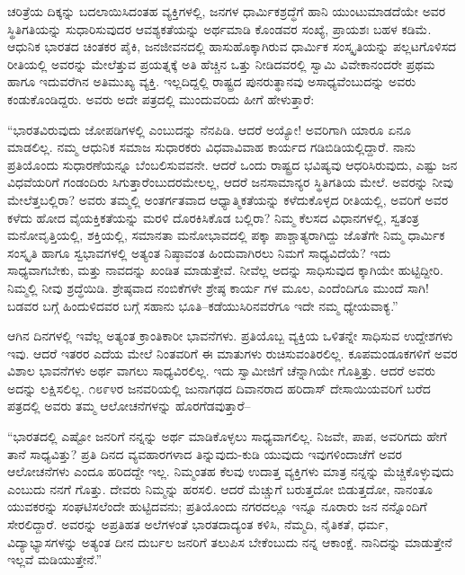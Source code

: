 ಚರಿತ್ರೆಯ ದಿಕ್ಕನ್ನು ಬದಲಾಯಿಸಿದಂತಹ ವ್ಯಕ್ತಿಗಳಲ್ಲಿ, ಜನಗಳ ಧಾರ್ಮಿಕಶ್ರದ್ಧೆಗೆ ಹಾನಿ ಯುಂಟುಮಾಡದೆಯೇ ಅವರ ಸ್ಥಿತಿಗತಿಯನ್ನು ಸುಧಾರಿಸುವುದರ ಆವಶ್ಯಕತೆಯನ್ನು ಅರ್ಥಮಾಡಿ ಕೊಂಡವರ ಸಂಖ್ಯೆ, ಪ್ರಾಯಶಃ ಬಹಳ ಕಡಿಮೆ. ಆಧುನಿಕ ಭಾರತದ ಚಿಂತಕರ ಪೈಕಿ, ಜನಜೀವನದಲ್ಲಿ ಹಾಸುಹೊಕ್ಕಾಗಿರುವ ಧಾರ್ಮಿಕ ಸಂಸ್ಕೃತಿಯನ್ನು ಪಲ್ಲಟಗೊಳಿಸದ ರೀತಿಯಲ್ಲಿ ಅವರನ್ನು ಮೇಲೆತ್ತುವ ಪ್ರಯತ್ನಕ್ಕೆ ಅತಿ ಹೆಚ್ಚಿನ ಒತ್ತು ನೀಡಿದವರಲ್ಲಿ ಸ್ವಾಮಿ ವಿವೇಕಾನಂದರೇ ಪ್ರಥಮ ಹಾಗೂ ಇದುವರೆಗಿನ ಅತಿಮುಖ್ಯ ವ್ಯಕ್ತಿ. ಇಲ್ಲದಿದ್ದಲ್ಲಿ ರಾಷ್ಟ್ರದ ಪುನರುತ್ಥಾನವು ಅಸಾಧ್ಯವೆಂಬುದನ್ನು ಅವರು ಕಂಡುಕೊಂಡಿದ್ದರು. ಅವರು ಅದೇ ಪತ್ರದಲ್ಲಿ ಮುಂದುವರಿದು ಹೀಗೆ ಹೇಳುತ್ತಾರೆ:

“ಭಾರತವಿರುವುದು ಜೋಪಡಿಗಳಲ್ಲಿ ಎಂಬುದನ್ನು ನೆನಪಿಡಿ. ಆದರೆ ಅಯ್ಯೋ! ಅವರಿಗಾಗಿ ಯಾರೂ ಏನೂ ಮಾಡಲಿಲ್ಲ. ನಮ್ಮ ಆಧುನಿಕ ಸಮಾಜ ಸುಧಾರಕರು ವಿಧವಾವಿವಾಹ ಕಾರ್ಯದ ಗಡಿಬಿಡಿಯಲ್ಲಿದ್ದಾರೆ. ನಾನು ಪ್ರತಿಯೊಂದು ಸುಧಾರಣೆಯನ್ನೂ ಬೆಂಬಲಿಸುವವನೇ. ಆದರೆ ಒಂದು ರಾಷ್ಟ್ರದ ಭವಿಷ್ಯವು ಆಧರಿಸಿರುವುದು, ಎಷ್ಟು ಜನ ವಿಧವೆಯರಿಗೆ ಗಂಡಂದಿರು ಸಿಗುತ್ತಾರೆಂಬುದರಮೇಲಲ್ಲ, ಆದರೆ ಜನಸಾಮಾನ್ಯರ ಸ್ಥಿತಿಗತಿಯ ಮೇಲೆ. ಅವರನ್ನು ನೀವು ಮೇಲೆತ್ತಬಲ್ಲಿರಾ? ಅವರು ತಮ್ಮಲ್ಲಿ ಅಂತರ್ಗತವಾದ ಆಧ್ಯಾತ್ಮಿಕತೆಯನ್ನು ಕಳೆದುಕೊಳ್ಳದ ರೀತಿಯಲ್ಲಿ, ಅವರಿಗೆ ಅವರ ಕಳೆದು ಹೋದ ವೈಯಕ್ತಿಕತೆಯನ್ನು ಮರಳಿ ದೊರಕಿಸಿಕೊಡ ಬಲ್ಲಿರಾ? ನಿಮ್ಮ ಕೆಲಸದ ವಿಧಾನಗಳಲ್ಲಿ, ಸ್ವತಂತ್ರ ಮನೋವೃತ್ತಿಯಲ್ಲಿ, ಶಕ್ತಿಯಲ್ಲಿ, ಸಮಾನತಾ ಮನೋಭಾವದಲ್ಲಿ ಪಕ್ಕಾ ಪಾಶ್ಚಾತ್ಯರಾಗಿದ್ದು ಜೊತೆಗೇ ನಿಮ್ಮ ಧಾರ್ಮಿಕ ಸಂಸ್ಕೃತಿ ಹಾಗೂ ಸ್ವಭಾವಗಳಲ್ಲಿ ಅತ್ಯಂತ ನಿಷ್ಠಾವಂತ ಹಿಂದುವಾಗಿರಲು ನಿಮಗೆ ಸಾಧ್ಯವಿದೆಯೆ? ಇದು ಸಾಧ್ಯವಾಗಬೇಕು, ಮತ್ತು ನಾವದನ್ನು ಖಂಡಿತ ಮಾಡುತ್ತೇವೆ. ನೀವೆಲ್ಲ ಅದನ್ನು ಸಾಧಿಸುವುದ ಕ್ಕಾಗಿಯೇ ಹುಟ್ಟಿದ್ದೀರಿ. ನಿಮ್ಮಲ್ಲಿ ನೀವು ಶ್ರದ್ಧೆಯಿಡಿ. ಶ್ರೇಷ್ಠವಾದ ನಂಬಿಕೆಗಳೇ ಶ್ರೇಷ್ಠ ಕಾರ್ಯ ಗಳ ಮೂಲ, ಎಂದೆಂದಿಗೂ ಮುಂದೆ ಸಾಗಿ! ಬಡವರ ಬಗ್ಗೆ ಹಿಂದುಳಿದವರ ಬಗ್ಗೆ ಸಹಾನು ಭೂತಿ–ಕಡೆಯುಸಿರಿನವರೆಗೂ ಇದೇ ನಮ್ಮ ಧ್ಯೇಯವಾಕ್ಯ.”

ಆಗಿನ ದಿನಗಳಲ್ಲಿ ಇವೆಲ್ಲ ಅತ್ಯಂತ ಕ್ರಾಂತಿಕಾರೀ ಭಾವನೆಗಳು. ಪ್ರತಿಯೊಬ್ಬ ವ್ಯಕ್ತಿಯ ಒಳಿತನ್ನೇ ಸಾಧಿಸುವ ಉದ್ದೇಶಗಳು ಇವು. ಆದರೆ ಇತರರ ಎದೆಯ ಮೇಲೆ ನಿಂತವರಿಗೆ ಈ ಮಾತುಗಳು ರುಚಿಸುವಂತಿರಲಿಲ್ಲ. ಕೂಪಮಂಡೂಕಗಳಿಗೆ ಅವರ ವಿಶಾಲ ಭಾವನೆಗಳು ಅರ್ಥ ವಾಗಲು ಸಾಧ್ಯವಿರಲಿಲ್ಲ. ಇದು ಸ್ವಾಮೀಜಿಗೆ ಚೆನ್ನಾಗಿಯೇ ಗೊತ್ತಿತ್ತು. ಆದರೆ ಅವರು ಅದನ್ನು ಲಕ್ಷಿಸಲಿಲ್ಲ. ೧೮೯೪ರ ಜನವರಿಯಲ್ಲಿ ಜುನಾಗಢದ ದಿವಾನರಾದ ಹರಿದಾಸ್ ದೇಸಾಯಿಯವರಿಗೆ ಬರೆದ ಪತ್ರದಲ್ಲಿ ಅವರು ತಮ್ಮ ಆಲೋಚನೆಗಳನ್ನು ಹೊರಗೆಡವುತ್ತಾರೆ–

“ಭಾರತದಲ್ಲಿ ಎಷ್ಟೋ ಜನರಿಗೆ ನನ್ನನ್ನು ಅರ್ಥ ಮಾಡಿಕೊಳ್ಳಲು ಸಾಧ್ಯವಾಗಲಿಲ್ಲ. ನಿಜವೇ, ಪಾಪ, ಅವರಿಗದು ಹೇಗೆ ತಾನೆ ಸಾಧ್ಯವಿತ್ತು? ಪ್ರತಿ ದಿನದ ವ್ಯವಹಾರಗಳಾದ ತಿನ್ನುವುದು-ಕುಡಿ ಯುವುದು ಇವುಗಳಿಂದಾಚೆಗೆ ಅವರ ಆಲೋಚನೆಗಳು ಎಂದೂ ಹರಿದದ್ದೇ ಇಲ್ಲ. ನಿಮ್ಮಂತಹ ಕೆಲವು ಉದಾತ್ತ ವ್ಯಕ್ತಿಗಳು ಮಾತ್ರ ನನ್ನನ್ನು ಮೆಚ್ಚಿಕೊಳ್ಳುವುದು ಎಂಬುದು ನನಗೆ ಗೊತ್ತು. ದೇವರು ನಿಮ್ಮನ್ನು ಹರಸಲಿ. ಆದರೆ ಮೆಚ್ಚುಗೆ ಬರುತ್ತದೋ ಬಿಡುತ್ತದೋ, ನಾನಂತೂ ಯುವಕರನ್ನು ಸಂಘಟಿಸಲೆಂದೇ ಹುಟ್ಟಿದವನು; ಪ್ರತಿಯೊಂದು ನಗರದಲ್ಲೂ ಇನ್ನೂ ನೂರಾರು ಜನ ನನ್ನೊಂದಿಗೆ ಸೇರಲಿದ್ದಾರೆ. ಅವರನ್ನು ಅಪ್ರತಿಹತ ಅಲೆಗಳಂತೆ ಭಾರತದಾದ್ಯಂತ ಕಳಿಸಿ, ನೆಮ್ಮದಿ, ನೈತಿಕತೆ, ಧರ್ಮ, ವಿದ್ಯಾಭ್ಯಾಸಗಳನ್ನು ಅತ್ಯಂತ ದೀನ ದುರ್ಬಲ ಜನರಿಗೆ ತಲುಪಿಸ ಬೇಕೆಂಬುದು ನನ್ನ ಆಕಾಂಕ್ಷೆ. ನಾನಿದನ್ನು ಮಾಡುತ್ತೇನೆ ಇಲ್ಲವೆ ಮಡಿಯುತ್ತೇನೆ.”

